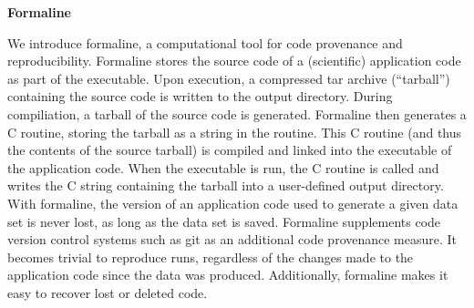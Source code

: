 \documentclass[12pt]{article}
\begin{document}
\begin{center}
\textbf{Formaline} 
\end{center}

We introduce formaline, a computational tool for code provenance and reproducibility. Formaline stores the source code of a (scientific) application code as part of the executable. Upon execution, a compressed tar archive (``tarball'') containing the source code is written to the output directory. During compiliation, a tarball of the source code is generated. Formaline then generates a C routine, storing the tarball as a string in the routine. This C routine (and thus the contents of the source tarball) is compiled and linked into the executable of the application code. When the executable is run, the C routine is called and writes the C string containing the tarball into a user-defined output directory. With formaline, the version of an application code used to generate a given data set is never lost, as long as the data set is saved. Formaline supplements code version control systems such as git as an additional code provenance measure. It becomes trivial to reproduce runs, regardless of the changes made to the application code since the data was produced. Additionally, formaline makes it easy to recover lost or deleted code. 
\end{document}
